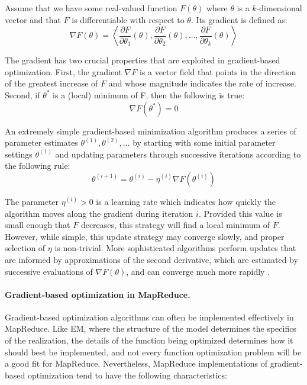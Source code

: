 Assume that we have some real-valued function $F(\theta)$ where
$\theta$ is a $k$-dimensional vector and that $F$ is differentiable
with respect to $\theta$.  Its gradient is defined as:
\begin{equation}
\nabla F(\theta) = \left\langle \frac{\partial F}{\partial \theta_1}(\theta), \frac{\partial F}{\partial \theta_2}(\theta) , \ldots , \frac{\partial F}{\partial \theta_k}(\theta) \right\rangle
\end{equation}

\noindent The gradient has two crucial properties that are exploited
in gradient-based optimization.  First, the gradient $\nabla F$ is a
vector field that points in the direction of the greatest increase of
$F$ and whose magnitude indicates the rate of increase.  Second, if
$\theta^*$ is a (local) minimum of F, then the following is true:
\begin{equation}
\nabla F(\theta^*) = 0
\end{equation}

An extremely simple gradient-based minimization algorithm produces a
series of parameter estimates $\theta^{(1)}, \theta^{(2)}, \ldots$ by
starting with some initial parameter settings $\theta^{(1)}$ and
updating parameters through successive iterations according to the
following rule:
\begin{equation}
\theta^{(i+1)} = \theta^{(i)} - \eta^{(i)} \nabla F(\theta^{(i)})
\label{chapter6_eq_grad_opt1}
\end{equation}

\noindent The parameter $\eta^{(i)} > 0$ is a learning rate which
indicates how quickly the algorithm moves along the gradient during
iteration $i$.  Provided this value is small enough that $F$
decreases, this strategy will find a local minimum of $F$.  However,
while simple, this update strategy may converge slowly, and proper
selection of $\eta$ is non-trivial.  More sophisticated algorithms
perform updates that are informed by approximations of the second
derivative, which are estimated by successive evaluations of $\nabla
F(\theta)$, and can converge much more rapidly \cite{LBFGS}.

\paragraph{\textbf{Gradient-based optimization in MapReduce.}}
Gradient-based optimization algorithms can often be implemented
effectively in MapReduce.  Like EM, where the structure of the model
determines the specifics of the realization, the details of the
function being optimized determines how it should best be implemented,
and not every function optimization problem will be a good fit for
MapReduce.  Nevertheless, MapReduce implementations of gradient-based
optimization tend to have the following characteristics:

